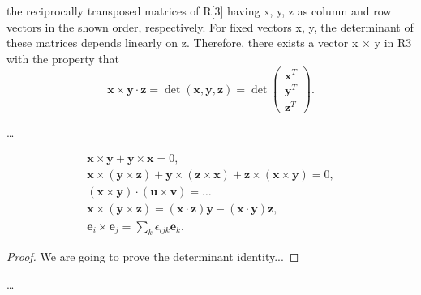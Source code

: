 the reciprocally transposed matrices of R[3] having x, y, z as column and row vectors in the shown order, respectively. For fixed vectors x, y, the determinant of these matrices depends linearly on z. Therefore, there exists a vector x × y in R3 with the property that
\[
    \mathbf{x} \times \mathbf{y} \cdot \mathbf{z} = \det(\mathbf{x}, \mathbf{y}, \mathbf{z}) = \det\begin{pmatrix}
        \textbf{x}^T \\
        \textbf{y}^T \\
        \textbf{z}^T
    \end{pmatrix}.
\]

\dots

\[
    \begin{aligned}
        \mathbf{x} \times \mathbf{y} + \mathbf{y} \times \mathbf{x} = 0,                                                                                            \\
        \mathbf{x} \times (\mathbf{y} \times \mathbf{z}) + \mathbf{y} \times (\mathbf{z} \times \mathbf{x}) + \mathbf{z} \times (\mathbf{x} \times \mathbf{y}) = 0, \\
        (\mathbf{x} \times \mathbf{y}) \cdot (\mathbf{u} \times \mathbf{v}) = \dots                                                                                 \\
        \mathbf{x} \times (\mathbf{y} \times \mathbf{z}) = (\mathbf{x} \cdot \mathbf{z}) \mathbf{y} - (\mathbf{x} \cdot \mathbf{y}) \mathbf{z},                     \\
        \mathbf{e}_i \times \mathbf{e}_j = \sum_k \epsilon_{ijk} \mathbf{e}_k.
    \end{aligned}
\]

\begin{proof}
    We are going to prove the determinant identity...
\end{proof}

\dots
